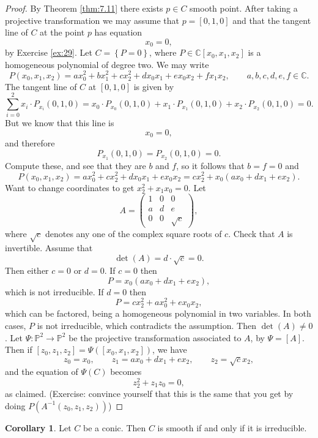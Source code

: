 \documentclass{article}
\newcommand{\C}{\mathbb{C}}
\renewcommand{\P}{\mathbb{P}}
\newcommand{\rb}[1]{\left( #1 \right)}
\renewcommand{\sb}[1]{\left[ #1 \right]}
\newcommand{\cb}[1]{\left\{ #1 \right\}}
\theoremstyle{definition}\newtheorem{definition}{Definition}[section]
\theoremstyle{definition}\newtheorem{notation}[definition]{Notation}
\theoremstyle{definition}\newtheorem{remark}[definition]{Remark}
\theoremstyle{definition}\newtheorem{example1}[definition]{Example}
\theoremstyle{definition}\newtheorem{fact}{Fact}
\theoremstyle{definition}\newtheorem{exercise}{Exercise}
\theoremstyle{definition}\newtheorem*{example2}{Example}
\newtheorem{corollary}[definition]{Corollary}
\begin{document}
\begin{proof}
By Theorem \ref{thm:7.11} there exists $ p \in C $ smooth point. After taking a projective transformation we may assume that $ p = \sb{0, 1, 0} $ and that the tangent line of $ C $ at the point $ p $ has equation
$$ x_0 = 0, $$
by Exercise \ref{ex:29}. Let $ C = \cb{P = 0} $, where $ P \in \C\sb{x_0, x_1, x_2} $ is a homogeneous polynomial of degree two. We may write
$$ P\rb{x_0, x_1, x_2} = ax_0^2 + bx_1^2 + cx_2^2 + dx_0x_1 + ex_0x_2 + fx_1x_2, \qquad a, b, c, d, e, f \in \C. $$
The tangent line of $ C $ at $ \sb{0, 1, 0} $ is given by
$$ \sum_{i = 0}^2 x_i \cdot P_{x_i}\rb{0, 1, 0} = x_0 \cdot P_{x_0}\rb{0, 1, 0} + x_1 \cdot P_{x_1}\rb{0, 1, 0} + x_2 \cdot P_{x_2}\rb{0, 1, 0} = 0. $$
But we know that this line is
$$ x_0 = 0, $$
and therefore
$$ P_{x_1}\rb{0, 1, 0} = P_{x_2}\rb{0, 1, 0} = 0. $$
Compute these, and see that they are $ b $ and $ f $, so it follows that $ b = f = 0 $ and
$$ P\rb{x_0, x_1, x_2} = ax_0^2 + cx_2^2 + dx_0x_1 + ex_0x_2 = cx_2^2 + x_0\rb{ax_0 + dx_1 + ex_2}. $$
Want to change coordinates to get $ x_2^2 + x_1x_0 = 0 $. Let
$$ A = \begin{pmatrix}
1 & 0 & 0 \\
a & d & e \\
0 & 0 & \sqrt{c}
\end{pmatrix}, $$
where $ \sqrt{c} $ denotes any one of the complex square roots of $ c $. Check that $ A $ is invertible. Assume that
$$ \det\rb{A} = d \cdot \sqrt{c} = 0. $$
Then either $ c = 0 $ or $ d = 0 $. If $ c = 0 $ then
$$ P = x_0\rb{ax_0 + dx_1 + ex_2}, $$
which is not irreducible. If $ d = 0 $ then
$$ P = cx_2^2 + ax_0^2 + ex_0x_2, $$
which can be factored, being a homogeneous polynomial in two variables. In both cases, $ P $ is not irreducible, which contradicts the assumption. Then $ \det\rb{A} \ne 0 $. Let $ \Psi : \P^2 \to \P^2 $ be the projective transformation associated to $ A $, by $ \Psi = \sb{A} $. Then if $ \sb{z_0, z_1, z_2} = \Psi\rb{\sb{x_0, x_1, x_2}} $, we have
$$ z_0 = x_0, \qquad z_1 = ax_0 + dx_1 + ex_2, \qquad z_2 = \sqrt{c}x_2, $$
and the equation of $ \Psi\rb{C} $ becomes
$$ z_2^2 + z_1z_0 = 0, $$
as claimed. (Exercise: convince yourself that this is the same that you get by doing $ P\rb{A^{-1}\rb{z_0, z_1, z_2}} $)
\end{proof}

\begin{corollary}
\label{cor:10.4}
Let $ C $ be a conic. Then $ C $ is smooth if and only if it is irreducible.
\end{corollary}
\end{document}
